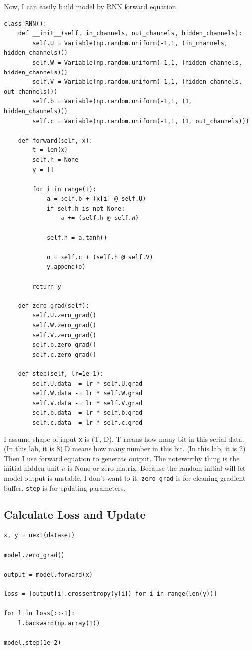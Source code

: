 \documentclass[12pt]{article}
\begin{document}
Now, I can easily build model by RNN forward equation.

\begin{verbatim}
class RNN():
    def __init__(self, in_channels, out_channels, hidden_channels):
        self.U = Variable(np.random.uniform(-1,1, (in_channels, hidden_channels)))
        self.W = Variable(np.random.uniform(-1,1, (hidden_channels, hidden_channels)))
        self.V = Variable(np.random.uniform(-1,1, (hidden_channels, out_channels)))
        self.b = Variable(np.random.uniform(-1,1, (1, hidden_channels)))
        self.c = Variable(np.random.uniform(-1,1, (1, out_channels)))
    
    def forward(self, x):
        t = len(x)
        self.h = None
        y = []
        
        for i in range(t):
            a = self.b + (x[i] @ self.U)
            if self.h is not None:
                a += (self.h @ self.W)
        
            self.h = a.tanh()
            
            o = self.c + (self.h @ self.V)
            y.append(o)
        
        return y
    
    def zero_grad(self):
        self.U.zero_grad()
        self.W.zero_grad()
        self.V.zero_grad()
        self.b.zero_grad()
        self.c.zero_grad()
    
    def step(self, lr=1e-1):
        self.U.data -= lr * self.U.grad
        self.W.data -= lr * self.W.grad
        self.V.data -= lr * self.V.grad
        self.b.data -= lr * self.b.grad
        self.c.data -= lr * self.c.grad
\end{verbatim}

I assume shape of input \verb|x| is (T, D). T means how many bit in this serial data. (In this lab, it is 8) D means how many number in this bit. (In this lab, it is 2) Then I use forward equation to generate output. The noteworthy thing is the initial hidden unit $h$ is None or zero matrix. Because the random initial will let model output is unstable, I don't want to it. \verb|zero_grad| is for cleaning gradient buffer. \verb|step| is for updating parameters.

\subsection{Calculate Loss and Update}

\begin{verbatim}
x, y = next(dataset)
    
model.zero_grad()
    
output = model.forward(x)
    
loss = [output[i].crossentropy(y[i]) for i in range(len(y))]
    
for l in loss[::-1]:
    l.backward(np.array(1))
        
model.step(1e-2)
\end{verbatim}
\end{document}
